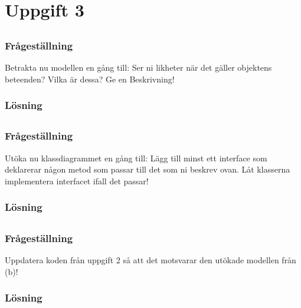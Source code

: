 %
%
%

\section{Uppgift 3}\label{sec:uppg3}

\subsection{}\label{sec:uppg3a}
\subsubsection*{Frågeställning}
Betrakta nu modellen en gång till: Ser ni likheter när det gäller objektens
beteenden? Vilka är dessa? Ge en Beskrivning!

\subsubsection*{Lösning}



\subsection{}\label{sec:uppg3b}
\subsubsection*{Frågeställning}
Utöka nu klassdiagrammet en gång till: Lägg till minst ett interface som
deklarerar någon metod som passar till det som ni beskrev ovan. Låt klasserna
implementera interfacet ifall det passar!

\subsubsection*{Lösning}



\subsection{}\label{sec:uppg3c}
\subsubsection*{Frågeställning}
Uppdatera koden från uppgift 2 så att det motsvarar den utökade modellen från
(b)!

\subsubsection*{Lösning}


